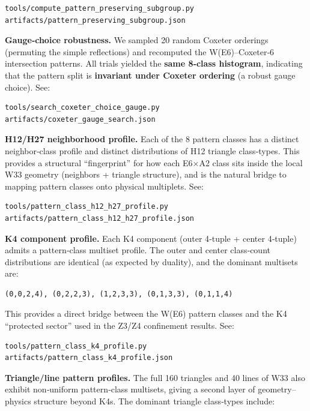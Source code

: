 \documentclass[11pt]{article}
\begin{document}
\begin{verbatim}
tools/compute_pattern_preserving_subgroup.py
artifacts/pattern_preserving_subgroup.json
\end{verbatim}

\textbf{Gauge‑choice robustness.} We sampled 20 random Coxeter orderings
(permuting the simple reflections) and recomputed the W(E6)--Coxeter‑6
intersection patterns. All trials yielded the \textbf{same 8‑class
histogram}, indicating that the pattern split is \textbf{invariant under
Coxeter ordering} (a robust gauge choice). See:

\begin{verbatim}
tools/search_coxeter_choice_gauge.py
artifacts/coxeter_gauge_search.json
\end{verbatim}

\textbf{H12/H27 neighborhood profile.} Each of the 8 pattern classes has
a distinct neighbor‑class profile and distinct distributions of H12
triangle class‑types. This provides a structural ``fingerprint'' for how
each E6\ensuremath{\times}A2 class sits inside the local W33 geometry
(neighbors + triangle structure), and is the natural bridge to mapping
pattern classes onto physical multiplets. See:

\begin{verbatim}
tools/pattern_class_h12_h27_profile.py
artifacts/pattern_class_h12_h27_profile.json
\end{verbatim}

\textbf{K4 component profile.} Each K4 component (outer 4‑tuple + center
4‑tuple) admits a pattern‑class multiset profile. The outer and center
class‑count distributions are identical (as expected by duality), and
the dominant multisets are:

\begin{verbatim}
(0,0,2,4), (0,2,2,3), (1,2,3,3), (0,1,3,3), (0,1,1,4)
\end{verbatim}

This provides a direct bridge between the W(E6) pattern classes and the
K4 ``protected sector'' used in the Z3/Z4 confinement results. See:

\begin{verbatim}
tools/pattern_class_k4_profile.py
artifacts/pattern_class_k4_profile.json
\end{verbatim}

\textbf{Triangle/line pattern profiles.} The full 160 triangles and 40
lines of W33 also exhibit non‑uniform pattern‑class multisets, giving a
second layer of geometry--physics structure beyond K4s. The dominant
triangle class‑types include:
\end{document}
